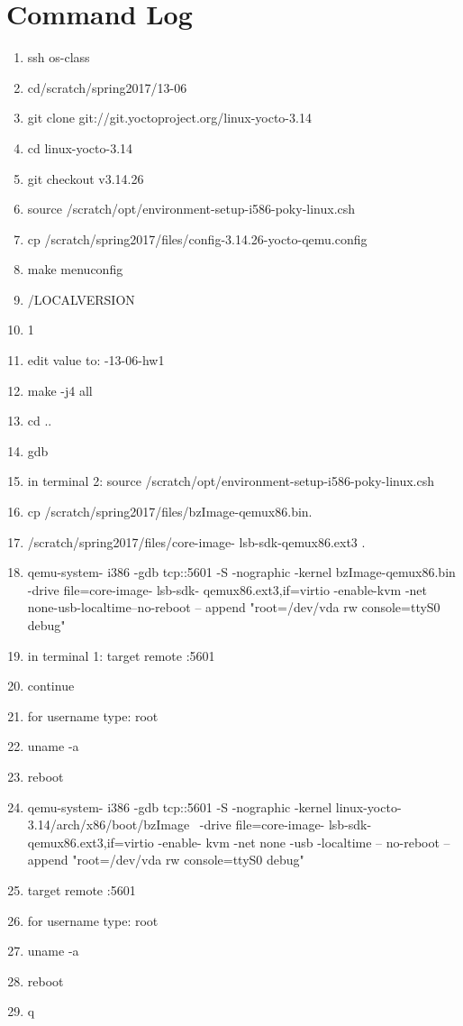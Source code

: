 \documentclass[draftclsnofoot,onecolumn,10pt,compsoc]{IEEEtran}
\begin{document}
\section{Command Log}
\begin{enumerate}
	\item ssh os-class
	\item cd/scratch/spring2017/13-06
	\item git clone git://git.yoctoproject.org/linux-yocto-3.14
	\item cd linux-yocto-3.14
	\item git checkout v3.14.26
	\item source /scratch/opt/environment-setup-i586-poky-linux.csh
	\item cp /scratch/spring2017/files/config-3.14.26-yocto-qemu.config
	\item make menuconfig
	\item /LOCALVERSION
	\item 1
	\item edit value to: -13-06-hw1 
	\item make -j4 all
	\item cd ..
	\item gdb
	\item in terminal 2: 
	source /scratch/opt/environment-setup-i586-poky-linux.csh
	\item cp /scratch/spring2017/files/bzImage-qemux86.bin.
	\item /scratch/spring2017/files/core-image- lsb-sdk-qemux86.ext3 .
	\item qemu-system- i386 -gdb tcp::5601 -S -nographic -kernel bzImage-qemux86.bin -drive file=core-image- lsb-sdk- qemux86.ext3,if=virtio -enable-kvm -net none-usb-localtime--no-reboot -- append	"root=/dev/vda rw console=ttyS0 debug"
	\item in terminal 1: target remote :5601
	\item continue
	\item for username type: root
	\item uname -a
	\item reboot
	\item qemu-system- i386 -gdb tcp::5601 -S -nographic -kernel linux-yocto- 3.14/arch/x86/boot/bzImage  -drive file=core-image- lsb-sdk- qemux86.ext3,if=virtio -enable- kvm -net none -usb -localtime -- no-reboot -- append	"root=/dev/vda rw console=ttyS0 debug"
	\item target remote :5601
	\item for username type: root
	\item uname -a
	\item reboot
	\item q
	
\end{enumerate}
\end{document}
